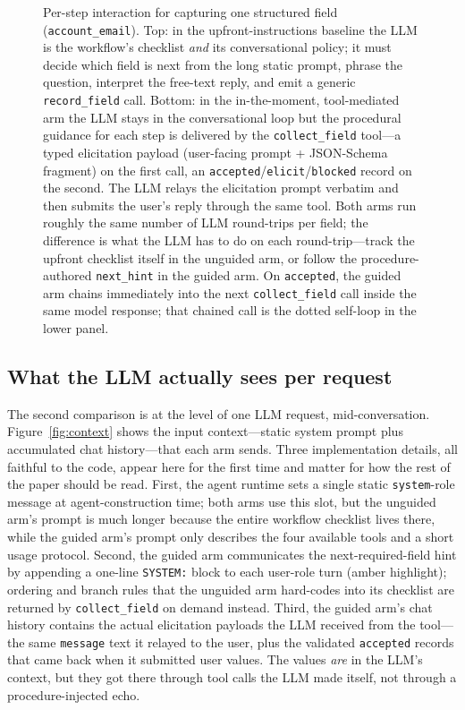 \documentclass[11pt,a4paper]{article}
\begin{document}
\begin{figure}[htbp]
\begin{tikzpicture}[x=1cm,y=0.70cm,>=Stealth]
\end{tikzpicture}
\caption{Per-step interaction for capturing one structured field (\texttt{account\_email}).
Top: in the upfront-instructions baseline the LLM is the workflow's checklist
\emph{and} its conversational policy; it must decide which field is next from
the long static prompt, phrase the question, interpret the free-text reply, and
emit a generic \texttt{record\_field} call. Bottom: in the in-the-moment,
tool-mediated arm the LLM stays in the conversational loop but the procedural
guidance for each step is delivered by the \texttt{collect\_field} tool---a
typed elicitation payload (user-facing prompt + JSON-Schema fragment) on the
first call, an \texttt{accepted}/\texttt{elicit}/\texttt{blocked} record on the
second. The LLM relays the elicitation prompt verbatim and then submits the
user's reply through the same tool. Both arms run roughly the same number of
LLM round-trips per field; the difference is what the LLM has to do on each
round-trip---track the upfront checklist itself in the unguided arm, or follow
the procedure-authored \texttt{next\_hint} in the guided arm. On
\texttt{accepted}, the guided arm chains immediately into the next
\texttt{collect\_field} call inside the same model response; that chained call
is the dotted self-loop in the lower panel.}
\label{fig:sequence}
\end{figure}

\subsection{What the LLM actually sees per request}

The second comparison is at the level of one LLM request, mid-conversation. Figure~\ref{fig:context} shows the input context---static system prompt plus accumulated chat history---that each arm sends. Three implementation details, all faithful to the code, appear here for the first time and matter for how the rest of the paper should be read. First, the agent runtime sets a single static \texttt{system}-role message at agent-construction time; both arms use this slot, but the unguided arm's prompt is much longer because the entire workflow checklist lives there, while the guided arm's prompt only describes the four available tools and a short usage protocol. Second, the guided arm communicates the next-required-field hint by appending a one-line \texttt{SYSTEM:} block to each user-role turn (amber highlight); ordering and branch rules that the unguided arm hard-codes into its checklist are returned by \texttt{collect\_field} on demand instead. Third, the guided arm's chat history contains the actual elicitation payloads the LLM received from the tool---the same \texttt{message} text it relayed to the user, plus the validated \texttt{accepted} records that came back when it submitted user values. The values \emph{are} in the LLM's context, but they got there through tool calls the LLM made itself, not through a procedure-injected echo.
\end{document}
